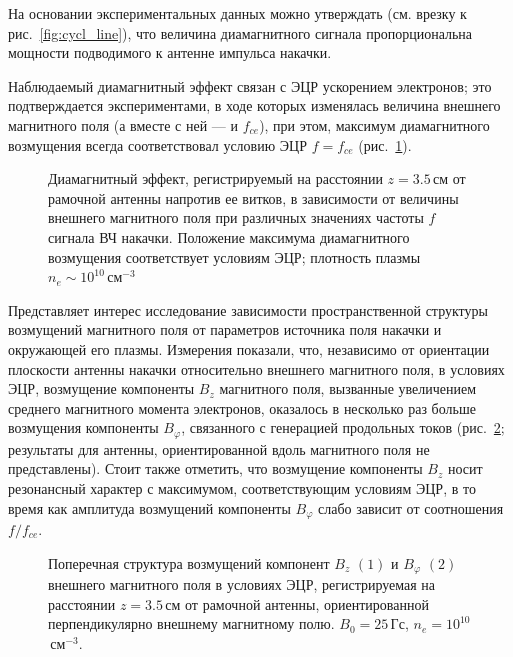 \documentclass[10pt]{disser}
\begin{document}
На основании экспериментальных данных можно утверждать (см. врезку к \mbox{рис.~\ref{fig:cycl_line}}), что величина диамагнитного сигнала пропорциональна мощности подводимого к антенне импульса накачки. 

Наблюдаемый диамагнитный эффект связан с ЭЦР ускорением электронов; это подтверждается экспериментами, в ходе которых изменялась величина внешнего магнитного поля (а вместе с ней --- и $f_{ce}$), при этом,  максимум диамагнитного возмущения всегда соответствовал условию ЭЦР $f=f_{ce}$ (\mbox{рис.~\ref{fig:ecr_combine}}).
\begin{figure}[H]
    \centering
    \def\svgwidth{0.45\columnwidth} %
    
    \caption{Диамагнитный эффект, регистрируемый на расстоянии $z=3.5$\,см от рамочной антенны напротив ее витков, в зависимости от величины внешнего магнитного поля при различных значениях частоты $f$ сигнала ВЧ накачки. Положение максимума диамагнитного возмущения соответствует условиям ЭЦР; плотность плазмы $n_{e}\sim{}10^{10}$\,см$^{-3}$}
    \label{fig:ecr_combine}
\end{figure}

Представляет интерес исследование зависимости пространственной структуры возмущений магнитного поля от параметров источника поля накачки и окружающей его плазмы.
Измерения показали, что, независимо от ориентации плоскости антенны накачки относительно внешнего магнитного поля, в условиях ЭЦР, возмущение компоненты $B_{z}$ магнитного поля, вызванные увеличением среднего магнитного момента электронов,  оказалось в несколько раз больше возмущения компоненты $B_{\varphi}$, связанного с генерацией продольных токов (\mbox{рис.~\ref{fig:transverse}}; результаты для антенны, ориентированной вдоль магнитного поля не представлены).  Стоит также отметить, что возмущение компоненты $B_{z}$ носит резонансный характер с максимумом, соответствующим условиям ЭЦР, в то время как амплитуда возмущений компоненты $B_{\varphi}$ слабо зависит от соотношения $f/f_{ce}$.
\begin{figure}[H]
    \centering
    \def\svgwidth{0.6\columnwidth} %
    
    \caption{Поперечная структура возмущений компонент $B_{z}$ $(1)$ и $B_{\varphi}$ $(2)$ внешнего магнитного поля в условиях ЭЦР, регистрируемая на расстоянии $z=3.5$\,см от рамочной антенны, ориентированной перпендикулярно внешнему магнитному полю. $B_{0}=25$\,Гс, $n_{e}=10^{10}$\,см$^{-3}$.}
    \label{fig:transverse}
\end{figure}
\end{document}
